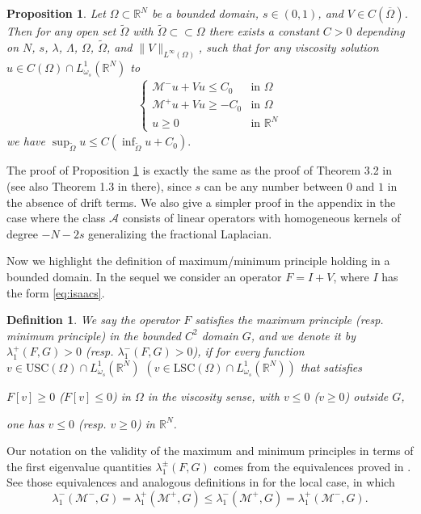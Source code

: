 \documentclass[a4paper,11pt]{article}
\newcommand{\R}{\mathbb{R}}
\newcommand{\M}{\mathcal{M}}
\newcommand{\I}{I}
\newcommand{\lsc}{\text{LSC}}
\newcommand{\usc}{\text{USC}}
\newcommand{\Lomega}{L_{\omega_s}^1(\R^N)}
\newtheorem{proposition}[theorem]{Proposition}
\newtheorem{definition}{Definition}
\begin{document}
\begin{proposition}\label{harnack}
	Let $\Omega \subset \mathbb{R}^N$ be a bounded domain, $s\in (0,1)$, and $V\in C(\overline{\Omega})$. Then for any open set $\tilde{\Omega}$ with $\tilde{\Omega} \subset \subset \Omega$ there exists a constant	$C>0$ depending on $N$, $s$, $\lambda$, $\Lambda$, $\Omega$, $\tilde{\Omega} $, and	$\|V\|_{ L^{\infty} ( \Omega ) } $, such that for any viscosity solution $u\in C( \Omega ) \cap \Lomega$ to
	\begin{align*}
		\begin{cases}
			\M^-u + Vu \leq C_0 & \text{in }\Omega\\
			\M^+u + Vu \geq -C_0 & \text{in }\Omega\\
			u\geq 0 & \text{in } \R^N
		\end{cases}
	\end{align*}
	we have
	$
	\sup _{\tilde{\Omega}} u\leq C  (\inf _{\tilde{\Omega}} u+ C_0 ).
	$
\end{proposition}
The proof of Proposition \ref{harnack} is exactly the same as the proof of Theorem 3.2  in \cite{Davila-Quaas-Topp-parab} (see also Theorem 1.3 in there), since $s$ can be any number between $0$ and $1$ in the absence of drift terms. We also give a simpler proof in the appendix in the case where the class $\mathcal{A}$ consists of linear operators with homogeneous kernels of degree $-N-2s$ generalizing the fractional Laplacian.

Now we highlight the definition of maximum/minimum principle holding in a bounded domain. In the sequel we consider an operator $F=\I+V$, where $\I$ has the form \eqref{eq:isaacs}.

\begin{definition}\label{defLambda+-}
\label{def:mp_operator}
We say the operator $F$ satisfies the maximum principle (resp. minimum principle) in the bounded $C^2$ domain $G$, and we denote it by $\lambda_1^+(F,G)>0$ (resp. $\lambda_1^-(F,G)>0$), if for every function $v\in \usc(\Omega)\cap \Lomega$ $(v\in \lsc(\Omega)\cap \Lomega )$ that satisfies \begin{center}
	$F[v]\geq 0$ ($F[v]\leq 0$) in $\Omega$ in the viscosity sense, with $v \leq 0$ ($v\ge 0$) outside $G$,
\end{center} one has $v\leq 0$ (resp. $v\ge 0$)  in $\R^N$.
\end{definition}


Our notation on the validity of the maximum and minimum principles in terms of the first eigenvalue quantities $\lambda_1^\pm(F,G)$ comes from the equivalences proved in \cite{quaas_principal_2020}. See those equivalences and analogous definitions in \cite{pq1} for the local case, in which 
$$\lambda_1^-(\M^-, G)=\lambda_1^+(\M^+, G)\le \lambda_1^-(\M^+, G)=\lambda_1^+(\M^-, G).$$
\end{document}
